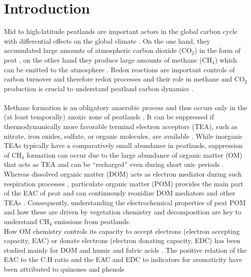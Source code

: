\documentclass[draft,linenumbers]{agujournal2018}
\begin{document}
\section{Introduction}

Mid to high-latitude peatlands are important actors in the global carbon
cycle with differential effects on the global climate
\citep{Frolking.2011}. On the one hand, they accumulated large amounts
of atmospheric carbon dioxide (CO\(_2\)) in the form of peat
\citep{Limpens.2008}, on the other hand they produce large amounts of
methane (CH\(_4\)) which can be emitted to the atmosphere
\citep{Limpens.2008, Frolking.2011}. Redox reactions are important
controls of carbon turnover and therefore redox processes and their role
in methane and CO\(_2\) production is crucial to understand peatland
carbon dynamics \citep{Limpens.2008}.\\
~\\
Methane formation is an obligatory anaerobic process and thus occurs
only in the (at least temporally) anoxic zone of peatlands
\citep{Limpens.2008}. It can be suppressed if thermodynamically more
favorable terminal electron acceptors (TEA), such as nitrate, iron
oxides, sulfate, or organic molecules, are available
\citep{Blodau.2011, Klupfel.2014, Gao.2019}. While inorganic TEAs
typically have a comparatively small abundance in peatlands, suppression
of CH\(_4\) formation can occur due to the large abundance of organic
matter (OM) that acts as TEA \citep{Gao.2019} and can be ``recharged''
even during short oxic periods
\citep{Klupfel.2014, Lau.2016, Walpen.2018b}. Whereas dissolved organic
matter (DOM) acts as electron mediator during such respiration processes
\citep{Lau.2016, Gao.2019}, particulate organic matter (POM) provides
the main part of the EAC of peat and can continuously reoxidize DOM
mediators and other TEAs \citep{Gao.2019, Blodau.2007}. Consequently,
understanding the electrochemical properties of peat POM and how these
are driven by vegetation chemistry and decomposition are key to
understand CH\(_4\) emissions from peatlands.\\
How OM chemistry controls its capacity to accept electrons (electron
accepting capacity, EAC) or donate electrons (electron donating
capacity, EDC) has been studied mainly for DOM and humic and fulvic
acids
\citep{Ratasuk.2007, Aeschbacher.2010, Aeschbacher.2012, Fimmen.2007, HernandezMontoya.2012, Tan.2017, Walpen.2018, LaCroix.2020}.
The positive relation of the EAC to the C:H ratio and the EAC and EDC to
indicators for aromaticity have been attributed to quinones and phenols
\end{document}
